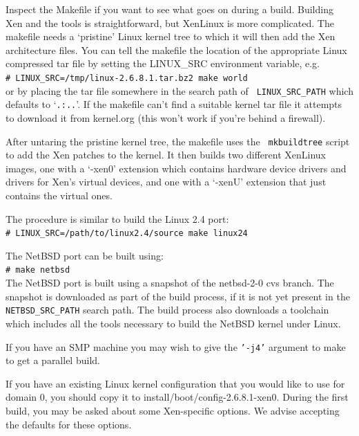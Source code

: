 \documentclass[11pt,twoside,final,openright]{xenstyle}
\begin{document}
Inspect the Makefile if you want to see what goes on during a build.
Building Xen and the tools is straightforward, but XenLinux is more
complicated.  The makefile needs a `pristine' Linux kernel tree to which
it will then add the Xen architecture files.  You can tell the
makefile the location of the appropriate Linux compressed tar file by
setting the LINUX\_SRC environment variable, e.g. \\
\verb!# LINUX_SRC=/tmp/linux-2.6.8.1.tar.bz2 make world! \\ or by
placing the tar file somewhere in the search path of {\tt
LINUX\_SRC\_PATH} which defaults to `{\tt .:..}'.  If the makefile
can't find a suitable kernel tar file it attempts to download it from
kernel.org (this won't work if you're behind a firewall).

After untaring the pristine kernel tree, the makefile uses the {\tt
mkbuildtree} script to add the Xen patches to the kernel.  It then
builds two different XenLinux images, one with a `-xen0' extension
which contains hardware device drivers and drivers for Xen's virtual
devices, and one with a `-xenU' extension that just contains the
virtual ones.

The procedure is similar to build the Linux 2.4 port: \\
\verb!# LINUX_SRC=/path/to/linux2.4/source make linux24!

The NetBSD port can be built using: \\ \verb!# make netbsd! \\ The
NetBSD port is built using a snapshot of the netbsd-2-0 cvs branch.
The snapshot is downloaded as part of the build process, if it is not
yet present in the {\tt NETBSD\_SRC\_PATH} search path.  The build
process also downloads a toolchain which includes all the tools
necessary to build the NetBSD kernel under Linux.

If you have an SMP machine you may wish to give the {\tt '-j4'}
argument to make to get a parallel build.

If you have an existing Linux kernel configuration that you would like
to use for domain 0, you should copy it to
install/boot/config-2.6.8.1-xen0.  During the first build, you may be
asked about some Xen-specific options.  We advise accepting the
defaults for these options.

\end{document}
